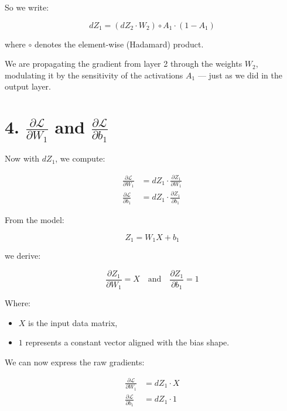 \documentclass[11pt]{article}
\begin{document}
\vspace{1em}

So we write:

\[
\boxed{
dZ_1 = (dZ_2 \cdot W_2) \circ A_1 \cdot (1 - A_1)
}
\]

where \( \circ \) denotes the element-wise (Hadamard) product.

\begin{tcolorbox}[colback=green!5!white, colframe=green!60!black, title=Interpretation]
We are propagating the gradient from layer 2 through the weights \( W_2 \),  
modulating it by the sensitivity of the activations \( A_1 \) — just as we did in the output layer.
\end{tcolorbox}



\section*{4. $\frac{\partial \mathcal{L}}{\partial W_1}$ and $\frac{\partial \mathcal{L}}{\partial b_1}$}

Now with \( dZ_1 \), we compute:


\[
\begin{aligned}
\frac{\partial \mathcal{L}}{\partial W_1} &= dZ_1 \cdot \frac{\partial Z_1}{\partial W_1} \\
\frac{\partial \mathcal{L}}{\partial b_1} &= dZ_1 \cdot \frac{\partial Z_1}{\partial b_1}
\end{aligned}
\]

\vspace{1em}

From the model:

\[
Z_1 = W_1 X + b_1
\]

we derive:

\[
\frac{\partial Z_1}{\partial W_1} = X
\quad \text{and} \quad
\frac{\partial Z_1}{\partial b_1} = 1
\]

Where:
\begin{itemize}
  \item \( X \) is the input data matrix,
  \item \( 1 \) represents a constant vector aligned with the bias shape.
\end{itemize}

\vspace{1em}

We can now express the raw gradients:

\[
\begin{aligned}
\frac{\partial \mathcal{L}}{\partial W_1} &= dZ_1 \cdot X \\
\frac{\partial \mathcal{L}}{\partial b_1} &= dZ_1 \cdot 1
\end{aligned}
\]
\end{document}
